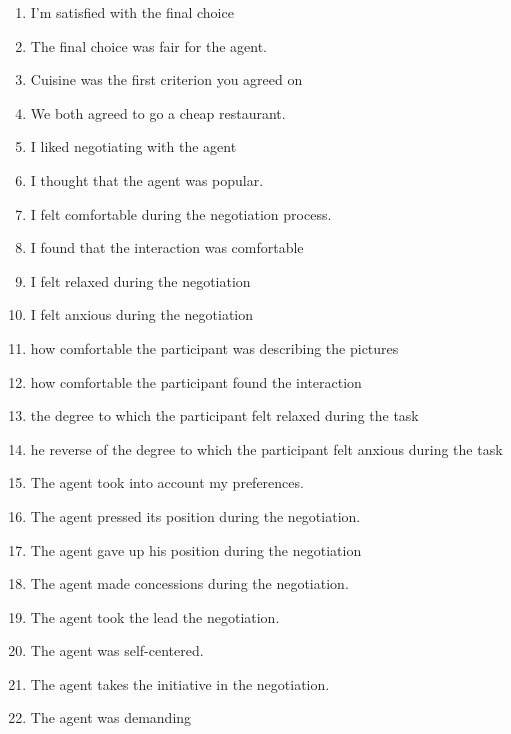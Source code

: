\documentclass [french]{paper}
\begin{document}
			\begin{enumerate}
				\item I'm satisfied with the final choice
				\item The final choice was fair for the agent.
				\item Cuisine was the first criterion you agreed on 
				\item  We both agreed to go a cheap restaurant.
				
				
				\item I liked negotiating with the agent
				\item I thought that the agent was popular.
				
				\item I felt comfortable during the negotiation process.
				\item I found that the interaction was comfortable
				\item I felt relaxed during the negotiation
				\item I felt anxious during the negotiation
				
				
				
				
				\item how comfortable the participant was describing the pictures
				\item how comfortable the participant found the interaction
				\item the degree to which the participant felt relaxed during the task
				\item he reverse of the degree to which the participant	felt anxious during the task
				


				
				\item The agent took into account my preferences.
				\item The agent pressed its position during the negotiation.
				\item The agent gave up his position during the negotiation
				\item The agent made concessions during the negotiation.
				\item The agent took the lead the negotiation.
				\item The agent was self-centered.
				\item The agent takes the initiative in the negotiation.
				\item The agent was demanding
				

\end{enumerate}
\end{document}
